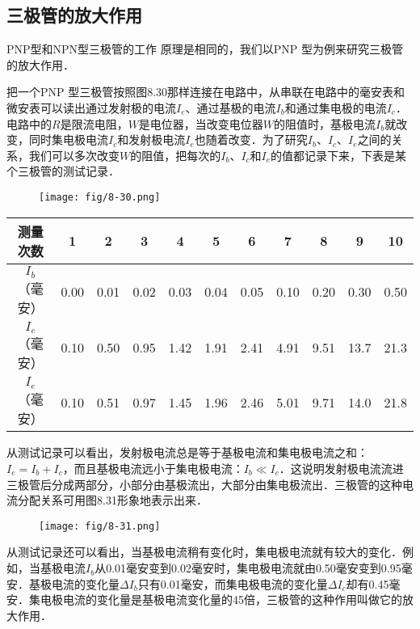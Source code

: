\subsection{三极管的放大作用}

PNP型和NPN型三极管的工作
原理是相同的，我们以PNP 型为例来研究三极管的放大作用．

把一个PNP 型三极管按照图8.30那样连接在电路中，从串联在电路中的毫安表和微安表可以读出通过发射极的电流$I_e$、通过基极的电流$I_b$和通过集电极的电流$I_c$．电路中的$R$是限流电阻，$W$是电位器，当改变电位器$W$的阻值时，基极电流$I_b$就改变，同时集电极电流$I_c$和发射极电流$I_e$也随着改变．为了研究$I_b$、$I_c$、$I_e$之间的关系，我们可以多次改变$W$的阻值，把每次的$I_b$、$I_c$和$I_e$的值都记录下来，下表是某个三极管的测试记录．
\begin{figure}[htp]\centering
    \texttt{[image: fig/8-30.png]}
    \caption{}
    \end{figure}

\begin{center}
    \begin{tabular}{ccccccccccc}
        \hline
测量次数  & 1&2&3&4&5&6&7&8&9&10\\
\hline
$I_b$（毫安）& 0.00 & 0.01 & 0.02 & 0.03 & 0.04 & 0.05 &0.10  & 0.20 & 0.30 & 0.50\\ 
$I_c$（毫安）&  0.10  & 0.50 & 0.95 & 1.42 & 1.91 & 2.41 & 4.91 & 9.51 & 13.7 &21.3\\
$I_e$（毫安）& 0.10 & 0.51 & 0.97 & 1.45 & 1.96 & 2.46 & 5.01 & 9.71 & 14.0 & 21.8 \\  
\hline
    \end{tabular}
\end{center}

从测试记录可以看出，发射极电流总是等于基极电流和集电极电流之和：$I_e=I_b+I_c$，而且基极电流远小于集电极电流：$I_b\ll I_c$．这说明发射极电流流进三极管后分成两部分，小部分由基极流出，大部分由集电极流出．三极管的这种电流分配关系可用图8.31形象地表示出来．
\begin{figure}[htp]\centering
    \texttt{[image: fig/8-31.png]}
    \caption{}
    \end{figure}

从测试记录还可以看出，当基极电流稍有变化时，集电极电流就有较大的变化．例如，当基极电流$I_b$从0.01毫安变到0.02毫安时，集电极电流就由0.50毫安变到0.95毫安．基极电流的变化量$\Delta I_b$只有0.01毫安，而集电极电流的变化量$\Delta I_c$却有0.45毫安．集电极电流的变化量是基极电流变化量的45倍，三极管的这种作用叫做它的放大作用．

